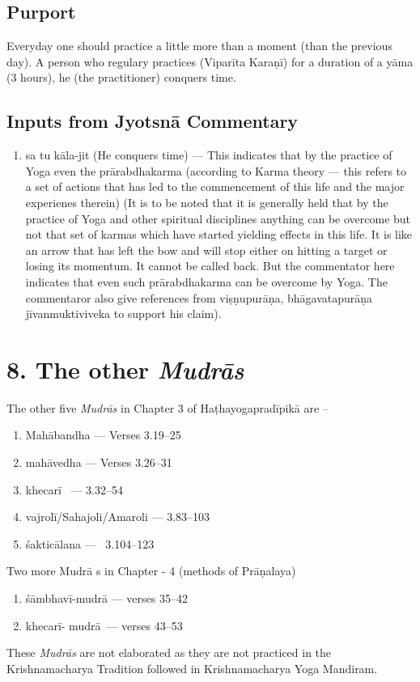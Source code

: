 \subsection*{Purport}

Everyday one should practice a little more than a moment (than the previous day). A person who regulary practices (Viparīta Karaṇī) for a duration of a yāma (3 hours), he (the practitioner) conquers time.

\subsection*{Inputs from Jyotsnā Commentary}

\begin{enumerate}
\item sa tu kāla-jit (He conquers time) --- This indicates that by the practice of Yoga even the prārabdhakarma (according to Karma theory --- this refers to a set of actions that has led to the commencement of this life and the major experienes therein) (It is to be noted that it is generally held that by the practice of Yoga and other spiritual disciplines anything can be overcome but not that set of karmas which have started yielding effects in this life. It is like an arrow that has left the bow and will stop either on hitting a target or losing its momentum. It cannot be called back. But the commentator here indicates that even such prārabdhakarma can be overcome by Yoga. The commentaror also give references from viṣṇupurāṇa, bhāgavatapurāṇa jīvanmuktiviveka to support his claim). 
\end{enumerate}
\newpage

\section*{8. The other \textit{Mudrās}}

The other five \textit{Mudrās} in Chapter 3 of Haṭhayogapradīpikā are – 

\begin{enumerate}
\item Mahābandha --- Verses 3.19--25 
\item mahāvedha  --- Verses 3.26--31
\item khecarī  --- 3.32--54
\item vajrolī/Sahajoli/Amaroli  --- 3.83--103 
\item śakticālana ---  3.104--123 
\end{enumerate}

Two more Mudrā s in Chapter - 4 (methods of Prāṇalaya)

\begin{enumerate}
\item śāmbhavī-mudrā --- verses 35--42
\item khecarī- mudrā --- verses 43--53
\end{enumerate}

These \textit{Mudrās} are not elaborated as they are not practiced in the Krishnamacharya Tradition followed in Krishnamacharya Yoga Mandiram.

